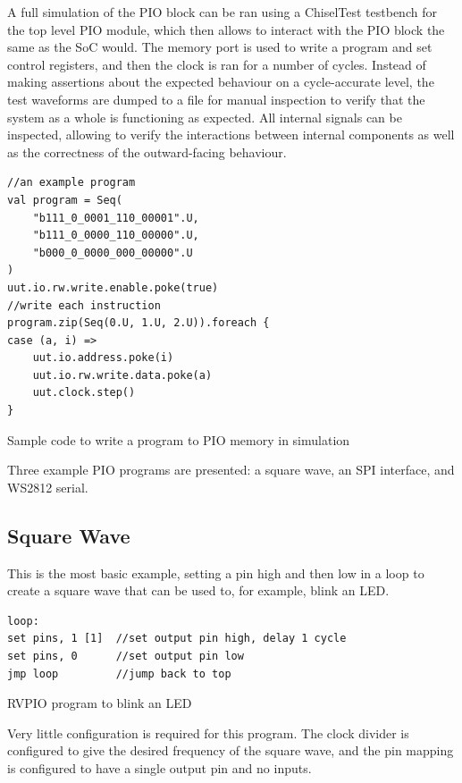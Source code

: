 A full simulation of the PIO block can be ran using a ChiselTest testbench for the top level PIO module, which then allows to interact with the PIO block the same as the SoC would. The memory port is used to write a program and set control registers, and then the clock is ran for a number of cycles. Instead of making assertions about the expected behaviour on a cycle-accurate level, the test waveforms are dumped to a file for manual inspection to verify that the system as a whole is functioning as expected. All internal signals can be inspected, allowing to verify the interactions between internal components as well as the correctness of the outward-facing behaviour.

\begin{listing}[h!]
    \begin{verbatim}
//an example program
val program = Seq(
    "b111_0_0001_110_00001".U,
    "b111_0_0000_110_00000".U, 
    "b000_0_0000_000_00000".U  
)
uut.io.rw.write.enable.poke(true)
//write each instruction
program.zip(Seq(0.U, 1.U, 2.U)).foreach {
case (a, i) =>
    uut.io.address.poke(i)
    uut.io.rw.write.data.poke(a)
    uut.clock.step()
}
    \end{verbatim}
    \caption{Sample code to write a program to PIO memory in simulation}
    \label{lst:sim-write-prog}
\end{listing}

Three example PIO programs are presented: a square wave, an SPI interface, and WS2812 serial.

\subsection{Square Wave}
\label{sec:blink-sim}

This is the most basic example, setting a pin high and then low in a loop to create a square wave that can be used to, for example, blink an LED.

\begin{listing}[h!]
    \begin{verbatim}
loop:
set pins, 1 [1]  //set output pin high, delay 1 cycle
set pins, 0      //set output pin low
jmp loop         //jump back to top
    \end{verbatim}
    \caption{RVPIO program to blink an LED}
    \label{lst:blinky}
\end{listing}

Very little configuration is required for this program. The clock divider is configured to give the desired frequency of the square wave, and the pin mapping is configured to have a single output pin and no inputs.

